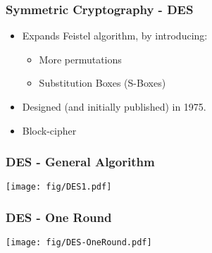 \documentclass[
hyperref={pdfpagelabels=false}
,xcolor=table
]
{beamer}
\begin{document}
\begin{frame}
  \frametitle{Symmetric Cryptography - DES}

  \begin{itemize}
  \item Expands Feistel algorithm, by introducing: 
    \begin{itemize}
    \item More permutations
    \item Substitution Boxes (S-Boxes)
    \end{itemize}
  \item Designed (and initially published) in 1975.
  \item Block-cipher
  \end{itemize}

\end{frame}




  


 


\begin{frame}
  \frametitle{DES - General Algorithm}
  \begin{center}
    \texttt{[image: fig/DES1.pdf]}
  \end{center} 
  
\end{frame}

\begin{frame}
  \frametitle{DES - One Round}
  \begin{center}
    \texttt{[image: fig/DES-OneRound.pdf]}
  \end{center} 

\end{frame}
\end{document}
